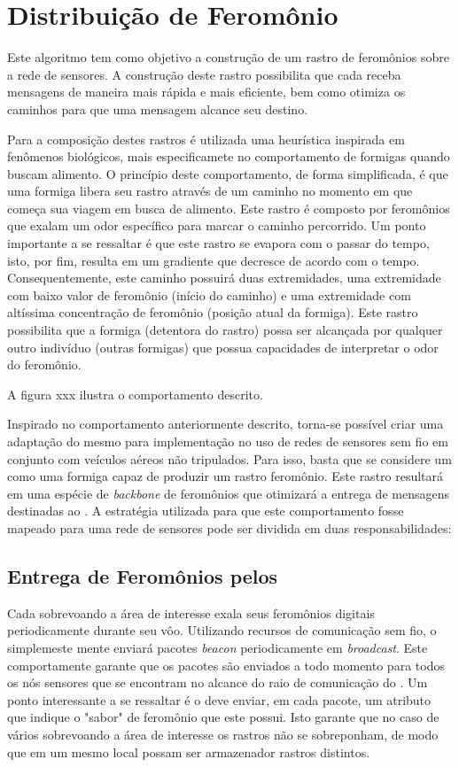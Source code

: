\section{Distribuição de Feromônio}
Este algoritmo tem como objetivo a construção de um rastro de feromônios sobre a rede de sensores. A construção deste rastro possibilita que cada \vant receba mensagens de
maneira mais rápida e mais eficiente, bem como otimiza os caminhos para que uma mensagem alcance seu destino.

Para a composição destes rastros é utilizada uma heurística inspirada em fenômenos biológicos, mais especificamete no comportamento de formigas quando buscam alimento.
O princípio deste comportamento, de forma simplificada,  é que uma formiga libera seu rastro através de um caminho no momento em que começa sua viagem em busca de alimento. Este rastro é composto por feromônios que exalam um odor específico para marcar o caminho percorrido. Um ponto importante a se ressaltar é que este rastro se evapora com o passar do tempo, isto, por fim, resulta em um gradiente que decresce de acordo com o tempo. Consequentemente, este caminho possuirá duas extremidades, uma extremidade com baixo valor de feromônio (início do caminho) e uma extremidade com altíssima concentração de feromônio (posição atual da formiga). Este rastro possibilita que a formiga (detentora do rastro) possa ser alcançada por qualquer outro indivíduo (outras formigas) que possua capacidades de interpretar o odor do feromônio.

A figura xxx ilustra o comportamento descrito.

Inspirado no comportamento anteriormente descrito, torna-se possível criar uma adaptação do mesmo para implementação no uso de redes de sensores sem fio em conjunto com veículos aéreos não tripulados. Para isso, basta que se considere um \vant como uma formiga capaz de produzir um rastro feromônio. Este rastro resultará em uma espécie de \emph{backbone} de feromônios que otimizará a entrega de mensagens destinadas ao \vant. A estratégia utilizada para que este comportamento fosse mapeado para uma rede de sensores pode ser dividida em duas responsabilidades:

\subsection{Entrega de Feromônios pelos \vants}
Cada \vant sobrevoando a área de interesse exala seus feromônios digitais periodicamente durante seu vôo. Utilizando recursos de comunicação sem fio, o \vant simplemeste mente enviará pacotes \emph{beacon} periodicamente em \emph{broadcast}. Este comportamente garante que os pacotes são enviados a todo momento para todos os nós sensores que se encontram no alcance do raio de comunicação do \vant. Um ponto interessante a se ressaltar é o \vant deve enviar, em cada pacote, um atributo que indique o "sabor" de feromônio que este \vant possui. Isto garante que no caso de vários \vants sobrevoando a área de interesse os rastros não se sobreponham, de modo que em um mesmo local possam ser armazenador rastros distintos.

